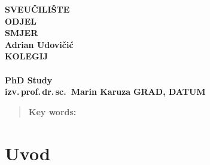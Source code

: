 \documentclass{article}
\begin{document}
\begin{titlepage}
	\begin{center}
		{\large \textbf{SVEUČILIŠTE}} \\[0.1cm]
		{\large \textbf{ODJEL}}
		\\[0.5cm]
		{\large \textbf{SMJER}}\\[0.5cm]
		\vspace{2cm}
		{\LARGE \textbf{Adrian Udovičić}}\\[2.5cm]
		{\Huge \textbf{KOLEGIJ}}\\[0.5cm]
		{\Huge \textbf{ }}\\[2cm]
		{\LARGE\textbf{PhD Study}}\\[2.5cm]
		\vspace{1.5cm}
		\hfill \large\textbf{izv.\,prof.\,dr.\,sc.~Marin Karuza}
		\vfill
		\large\textbf{{GRAD, DATUM}}
	\end{center}
\end{titlepage}

\newpage
{}
\tableofcontents
\newpage
{}
\begin{abstract}
	\textbf{Key words:}
\end{abstract}
\newpage

\section{Uvod}

\end{document}
